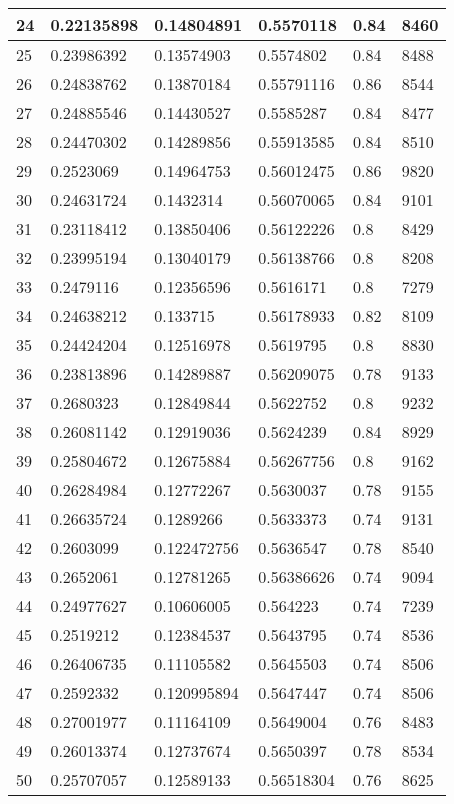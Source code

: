 \begin{longtable}{|l|l|l|l|l|l|}
24 & 0.22135898 & 0.14804891 & 0.5570118 & 0.84 & 8460 \\ \hline 
25 & 0.23986392 & 0.13574903 & 0.5574802 & 0.84 & 8488 \\ \hline 
26 & 0.24838762 & 0.13870184 & 0.55791116 & 0.86 & 8544 \\ \hline 
27 & 0.24885546 & 0.14430527 & 0.5585287 & 0.84 & 8477 \\ \hline 
28 & 0.24470302 & 0.14289856 & 0.55913585 & 0.84 & 8510 \\ \hline 
29 & 0.2523069 & 0.14964753 & 0.56012475 & 0.86 & 9820 \\ \hline 
30 & 0.24631724 & 0.1432314 & 0.56070065 & 0.84 & 9101 \\ \hline 
31 & 0.23118412 & 0.13850406 & 0.56122226 & 0.8 & 8429 \\ \hline 
32 & 0.23995194 & 0.13040179 & 0.56138766 & 0.8 & 8208 \\ \hline 
33 & 0.2479116 & 0.12356596 & 0.5616171 & 0.8 & 7279 \\ \hline 
34 & 0.24638212 & 0.133715 & 0.56178933 & 0.82 & 8109 \\ \hline 
35 & 0.24424204 & 0.12516978 & 0.5619795 & 0.8 & 8830 \\ \hline 
36 & 0.23813896 & 0.14289887 & 0.56209075 & 0.78 & 9133 \\ \hline 
37 & 0.2680323 & 0.12849844 & 0.5622752 & 0.8 & 9232 \\ \hline 
38 & 0.26081142 & 0.12919036 & 0.5624239 & 0.84 & 8929 \\ \hline 
39 & 0.25804672 & 0.12675884 & 0.56267756 & 0.8 & 9162 \\ \hline 
40 & 0.26284984 & 0.12772267 & 0.5630037 & 0.78 & 9155 \\ \hline 
41 & 0.26635724 & 0.1289266 & 0.5633373 & 0.74 & 9131 \\ \hline 
42 & 0.2603099 & 0.122472756 & 0.5636547 & 0.78 & 8540 \\ \hline 
43 & 0.2652061 & 0.12781265 & 0.56386626 & 0.74 & 9094 \\ \hline 
44 & 0.24977627 & 0.10606005 & 0.564223 & 0.74 & 7239 \\ \hline 
45 & 0.2519212 & 0.12384537 & 0.5643795 & 0.74 & 8536 \\ \hline 
46 & 0.26406735 & 0.11105582 & 0.5645503 & 0.74 & 8506 \\ \hline 
47 & 0.2592332 & 0.120995894 & 0.5647447 & 0.74 & 8506 \\ \hline 
48 & 0.27001977 & 0.11164109 & 0.5649004 & 0.76 & 8483 \\ \hline 
49 & 0.26013374 & 0.12737674 & 0.5650397 & 0.78 & 8534 \\ \hline 
50 & 0.25707057 & 0.12589133 & 0.56518304 & 0.76 & 8625 \\ \hline 
\end{longtable}